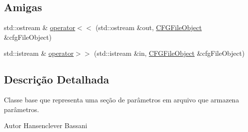 \subsection*{Amigas}
\begin{DoxyCompactItemize}
\item 
std\-::ostream \& \hyperlink{class_c_f_g_file_object_aecfe3f419c5a0b9474dfd4618323c587}{operator$<$$<$} (std\-::ostream \&out, \hyperlink{class_c_f_g_file_object}{C\-F\-G\-File\-Object} \&cfg\-File\-Object)
\item 
std\-::istream \& \hyperlink{class_c_f_g_file_object_a27640d1aa1cb5605f33a088f636af48f}{operator$>$$>$} (std\-::istream \&in, \hyperlink{class_c_f_g_file_object}{C\-F\-G\-File\-Object} \&cfg\-File\-Object)
\end{DoxyCompactItemize}


\subsection{Descrição Detalhada}
Classe base que representa uma seção de parâmetros em arquivo que armazena parâmetros. \begin{DoxyAuthor}{Autor}
Hansenclever Bassani 
\end{DoxyAuthor}


